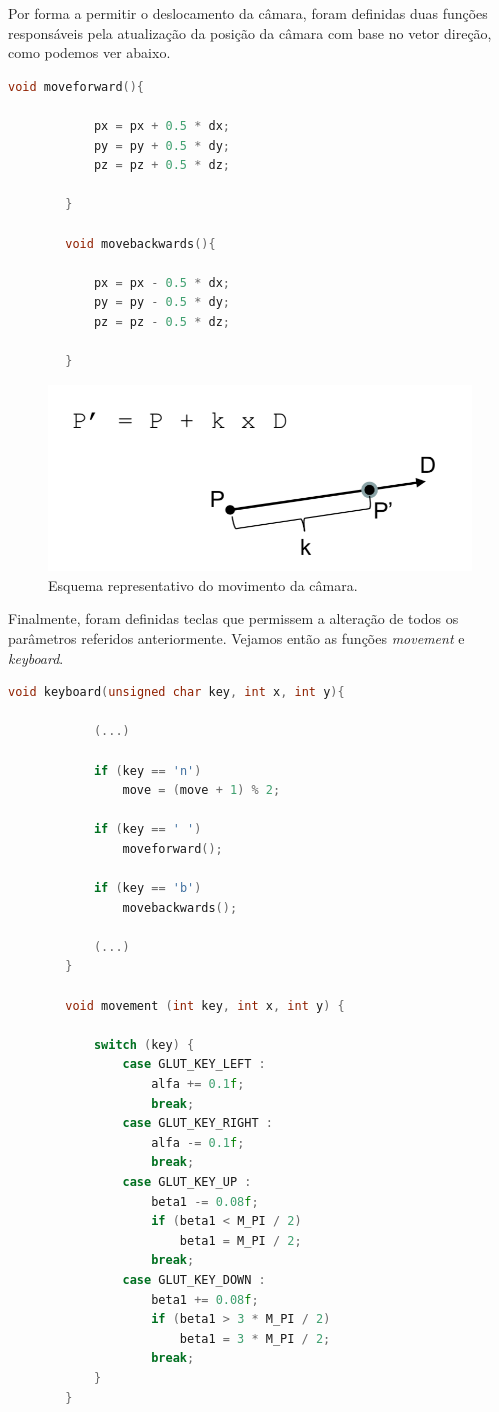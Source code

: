 \documentclass[a4paper]{article}
\begin{document}
Por forma a permitir o deslocamento da câmara, foram definidas duas funções responsáveis pela atualização da posição da câmara com base no vetor direção, como podemos ver abaixo.

\begin{lstlisting}[language=C++, caption=Definição das funções responsáveis pelo movimento para frente e trás da câmara.]
        void moveforward(){

            px = px + 0.5 * dx;
            py = py + 0.5 * dy;
            pz = pz + 0.5 * dz;

        }

        void movebackwards(){

            px = px - 0.5 * dx;
            py = py - 0.5 * dy;
            pz = pz - 0.5 * dz;

        }
\end{lstlisting}

\begin{figure}[!h]
    \centering
    \includegraphics[width=0.5\linewidth]{referencial_FPS2.png}
    \caption{Esquema representativo do movimento da câmara.}
    \label{fig:ref_FPS3}
\end{figure}

Finalmente, foram definidas teclas que permissem a alteração de todos os parâmetros referidos anteriormente. Vejamos então as funções \textit{movement} e \textit{keyboard}.

\begin{lstlisting}[language=C++, caption=Definição das funções responsáveis pelo movimento para frente e trás da câmara.]
        void keyboard(unsigned char key, int x, int y){

            (...)

            if (key == 'n')
                move = (move + 1) % 2;

            if (key == ' ')
                moveforward();

            if (key == 'b')
                movebackwards();

            (...)
        }

        void movement (int key, int x, int y) {

            switch (key) {
                case GLUT_KEY_LEFT :
                    alfa += 0.1f;
                    break;
                case GLUT_KEY_RIGHT :
                    alfa -= 0.1f;
                    break;
                case GLUT_KEY_UP :
                    beta1 -= 0.08f;
                    if (beta1 < M_PI / 2)
                        beta1 = M_PI / 2;
                    break;
                case GLUT_KEY_DOWN :
                    beta1 += 0.08f;
                    if (beta1 > 3 * M_PI / 2)
                        beta1 = 3 * M_PI / 2;
                    break;
            }
        }
\end{lstlisting}
\end{document}
